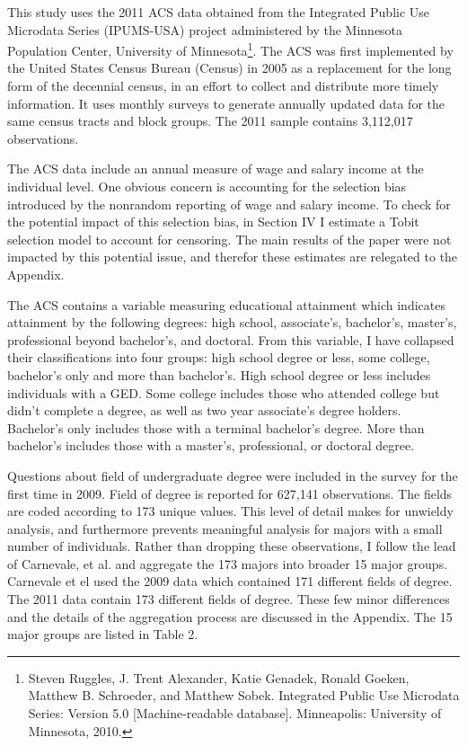 \documentclass[11pt]{article}
\theoremstyle{definition}
\begin{document}
\indent
\par
This study uses the 2011 ACS data obtained from the Integrated Public Use Microdata Series (IPUMS-USA) project administered by the Minnesota Population Center, University of Minnesota\footnote{Steven Ruggles, J. Trent Alexander, Katie Genadek, Ronald Goeken, Matthew B. Schroeder, and Matthew Sobek. Integrated Public Use Microdata Series: Version 5.0 [Machine-readable database]. Minneapolis: University of Minnesota, 2010.}.  The ACS was first implemented by the United States Census Bureau (Census) in 2005 as a replacement for the long form of the decennial census, in an effort to collect and distribute more timely information. It uses monthly surveys to generate annually updated data for the same census tracts and block groups.  The 2011 sample contains 3,112,017 observations.  

\vspace{2mm}
The ACS data include an annual measure of wage and salary income at the individual level.  One obvious concern is accounting for the selection bias introduced by the nonrandom reporting of wage and salary income.  To check for the potential impact of this selection bias, in Section IV I estimate a Tobit selection model to account for censoring.  The main results of the paper were not impacted by this potential issue, and therefor these estimates are relegated to the Appendix.   

\vspace{2mm}
The ACS contains a variable measuring educational attainment which indicates attainment by the following degrees: high school, associate's, bachelor's, master's, professional beyond bachelor's, and doctoral.  From this variable, I have collapsed their classifications into four groups: high school degree or less, some college,  bachelor's only and more than bachelor's.  High school degree or less includes individuals with a GED.  Some college includes those who attended college but didn't complete a degree, as well as two year associate's degree holders.  Bachelor's only includes those with a terminal bachelor's degree.  More than bachelor's includes those with a master's, professional, or doctoral degree.   

\vspace{2mm}
Questions about field of undergraduate degree were included in the survey for the first time in 2009.  Field of degree is reported for 627,141 observations.    The fields are coded according to 173 unique values.  This level of detail makes for unwieldy analysis, and furthermore prevents meaningful analysis for majors with a small number of individuals.  Rather than dropping these observations, I follow the lead of Carnevale, et al. and aggregate the 173 majors into broader 15 major groups.  Carnevale et el used the 2009 data which contained 171 different fields of degree.  The 2011 data contain 173 different fields of degree.  These few minor differences and the details of the aggregation process are discussed in the Appendix.  The 15 major groups are listed in Table 2.
\end{document}
